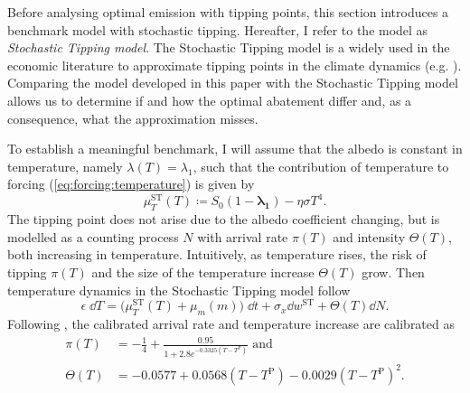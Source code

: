\documentclass[../../main.tex]{subfiles}
\begin{document}
Before analysing optimal emission with tipping points, this section introduces a benchmark model with stochastic tipping. Hereafter, I refer to the model as \textit{Stochastic Tipping model}. The Stochastic Tipping model is a widely used in the economic literature to approximate tipping points in the climate dynamics (e.g. \citealt{hambel_optimal_2021}). Comparing the model developed in this paper with the Stochastic Tipping model allows us to determine if and how the optimal abatement differ and, as a consequence, what the approximation misses.

To establish a meaningful benchmark, I will assume that the albedo is constant in temperature, namely $\lambda(T) = \lambda_1$, such that the contribution of temperature to forcing (\ref{eq:forcing:temperature}) is given by \begin{equation}
    \mu^{\mathrm{ST}}_T(T) \coloneqq S_0 (1 - \mathbf{\lambda_1}) - \eta\sigma T^4.
\end{equation} The tipping point does not arise due to the albedo coefficient changing, but is modelled as a counting process $N$ with arrival rate $\pi(T)$ and intensity $\Theta(T)$, both increasing in temperature. Intuitively, as temperature rises, the risk of tipping $\pi(T)$ and the size of the temperature increase $\Theta(T)$ grow. Then temperature dynamics in the Stochastic Tipping model follow \begin{equation}
    \epsilon \; \dd{T} = \big(\mu^{\mathrm{ST}}_T(T)  + \mu_m(m) \big) \; \dd{t} + \sigma_x \dd{w}^{\mathrm{ST}} + \Theta(T) \dd{N}.
\end{equation} Following \cite{hambel_optimal_2021}, the calibrated arrival rate and temperature increase are calibrated as \begin{align}
    \pi(T) &=  -\frac{1}{4} + \frac{0.95}{1 + 2.8 e^{-0.3325 (T - T^{\mathrm{P}})}} \text{ and } \\
    \Theta(T) &= -0.0577 + 0.0568 (T - T^{\mathrm{P}})-0.0029(T - T^{\mathrm{P}})^2.
\end{align}
\end{document}

